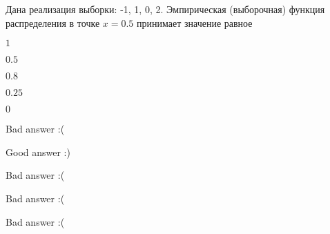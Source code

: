 
\begin{question}
Дана реализация выборки: -1, 1, 0, 2. Эмпирическая (выборочная) функция
распределения в точке \(x=0.5\) принимает значение равное
\begin{answerlist}
  \item \(1\)
  \item \(0.5\)
  \item \(0.8\)
  \item \(0.25\)
  \item \(0\)
\end{answerlist}
\end{question}

\begin{solution}
\begin{answerlist}
  \item Bad answer :(
  \item Good answer :)
  \item Bad answer :(
  \item Bad answer :(
  \item Bad answer :(
\end{answerlist}
\end{solution}

